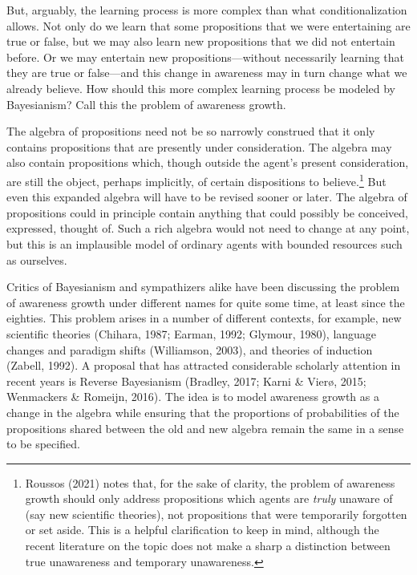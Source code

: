 \documentclass[
  11pt,
  dvipsnames,enabledeprecatedfontcommands]{scrartcl}
\begin{document}
But, arguably, the learning process is more complex than what
conditionalization allows. Not only do we learn that some propositions
that we were entertaining are true or false, but we may also learn new
propositions that we did not entertain before. Or we may entertain new
propositions---without necessarily learning that they are true or
false---and this change in awareness may in turn change what we already
believe. How should this more complex learning process be modeled by
Bayesianism? Call this the problem of awareness growth.

The algebra of propositions need not be so narrowly construed that it
only contains propositions that are presently under consideration. The
algebra may also contain propositions which, though outside the agent's
present consideration, are still the object, perhaps implicitly, of
certain dispositions to believe.\footnote{Roussos (2021) notes that, for
  the sake of clarity, the problem of awareness growth should only
  address propositions which agents are \emph{truly} unaware of (say new
  scientific theories), not propositions that were temporarily forgotten
  or set aside. This is a helpful clarification to keep in mind,
  although the recent literature on the topic does not make a sharp a
  distinction between true unawareness and temporary unawareness.} But
even this expanded algebra will have to be revised sooner or later. The
algebra of propositions could in principle contain anything that could
possibly be conceived, expressed, thought of. Such a rich algebra would
not need to change at any point, but this is an implausible model of
ordinary agents with bounded resources such as ourselves.

Critics of Bayesianism and sympathizers alike have been discussing the
problem of awareness growth under different names for quite some time,
at least since the eighties. This problem arises in a number of
different contexts, for example, new scientific theories (Chihara, 1987;
Earman, 1992; Glymour, 1980), language changes and paradigm shifts
(Williamson, 2003), and theories of induction (Zabell, 1992). A proposal
that has attracted considerable scholarly attention in recent years is
Reverse Bayesianism (Bradley, 2017; Karni \& Vierø, 2015; Wenmackers \&
Romeijn, 2016). The idea is to model awareness growth as a change in the
algebra while ensuring that the proportions of probabilities of the
propositions shared between the old and new algebra remain the same in a
sense to be specified.
\end{document}
